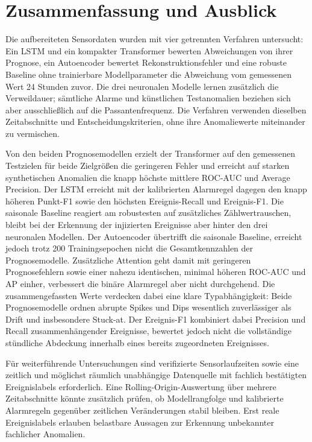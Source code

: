 \chapter{Zusammenfassung und Ausblick}
\label{ch:Zusammenfassung}

Die aufbereiteten Sensordaten wurden mit vier getrennten Verfahren untersucht:
Ein LSTM und ein kompakter Transformer bewerten Abweichungen von ihrer
Prognose, ein Autoencoder bewertet Rekonstruktionsfehler und eine robuste
Baseline ohne trainierbare Modellparameter die Abweichung vom gemessenen Wert
24 Stunden zuvor.
Die drei neuronalen Modelle lernen zusätzlich die Verweildauer; sämtliche
Alarme und künstlichen Testanomalien beziehen sich aber ausschließlich auf die
Passantenfrequenz. Die Verfahren verwenden dieselben Zeitabschnitte und
Entscheidungskriterien, ohne ihre Anomaliewerte miteinander zu vermischen.

Von den beiden Prognosemodellen erzielt der Transformer auf den gemessenen
Testzielen für beide Zielgrößen die geringeren Fehler und erreicht auf starken
synthetischen Anomalien die knapp höchste mittlere ROC-AUC und Average
Precision. Der LSTM erreicht mit der kalibrierten Alarmregel dagegen den knapp
höheren Punkt-F1 sowie den höchsten Ereignis-Recall und Ereignis-F1. Die
saisonale Baseline reagiert am robustesten auf zusätzliches Zählwertrauschen,
bleibt bei der Erkennung der injizierten Ereignisse aber hinter den drei
neuronalen Modellen. Der Autoencoder übertrifft die saisonale Baseline, erreicht
jedoch trotz 200 Trainingsepochen nicht die
Gesamtkennzahlen der Prognosemodelle. Zusätzliche Attention geht damit mit
geringeren Prognosefehlern sowie einer nahezu identischen, minimal höheren
ROC-AUC und AP einher, verbessert die binäre Alarmregel aber nicht durchgehend.
Die zusammengefassten Werte verdecken dabei eine klare Typabhängigkeit: Beide
Prognosemodelle ordnen abrupte Spikes und Dips wesentlich zuverlässiger als
Drift und insbesondere Stuck-at. Der Ereignis-F1 kombiniert dabei Precision
und Recall zusammenhängender Ereignisse, bewertet jedoch nicht die vollständige
stündliche Abdeckung innerhalb eines bereits zugeordneten Ereignisses.

Für weiterführende Untersuchungen sind verifizierte Sensorlaufzeiten sowie
eine zeitlich und möglichst räumlich unabhängige Datenquelle mit fachlich
bestätigten Ereignislabels erforderlich. Eine Rolling-Origin-Auswertung über
mehrere Zeitabschnitte könnte zusätzlich prüfen, ob Modellrangfolge und
kalibrierte Alarmregeln gegenüber zeitlichen Veränderungen stabil bleiben.
Erst reale Ereignislabels erlauben belastbare Aussagen zur Erkennung
unbekannter fachlicher Anomalien.

